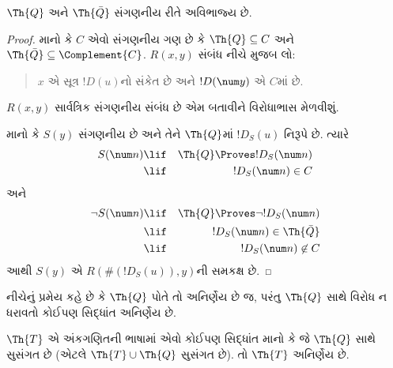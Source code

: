 \begin{lem}
$\Th{Q}$ અને
$\Th{\bar Q}$ સંગણનીય
રીતે અવિભાજ્ય છે.
\end{lem}

\begin{proof}
માનો કે $C$ એવો સંગણનીય
ગણ છે કે $\Th{Q} \subseteq C$
અને $\Th{\bar Q} \subseteq \Complement{C}$.
$R(x,y)$ સંબંધ નીચે મુજબ લો:
\begin{quote}
$x$ એ સૂત્ર $!D(u)$નો
સંકેત છે અને $!D(\num y)$
એ $C$માં છે.
\end{quote}
$R(x,y)$ સાર્વત્રિક
સંગણનીય સંબંધ છે એમ
બતાવીને વિરોધાભાસ
મેળવીશું.

માનો કે $S(y)$ સંગણનીય
છે અને તેને $\Th{Q}$માં
$!D_S(u)$ નિરૂપે છે.
ત્યારે
\begin{eqnarray*}
S(\num n) & \lif & \Th{Q} \Proves !D_S(\num n) \\
& \lif & !D_S(\num n) \in C
\end{eqnarray*}
અને
\begin{eqnarray*}
\lnot S(\num n) & \lif & \Th{Q} \Proves \lnot !D_S(\num n) \\
& \lif & !D_S(\num n) \in \Th{\bar Q} \\
& \lif & !D_S(\num n) \not\in C
\end{eqnarray*}
આથી $S(y)$ એ
$R(\#(!D_S(u)),y)$ની
સમકક્ષ છે.
\end{proof}
\endgroup


\begingroup
\makeatletter{}\makeatother


\label{guunit:OLP-0310}


નીચેનું પ્રમેય કહે છે કે
$\Th{Q}$ પોતે તો અનિર્ણેય
છે જ, પરંતુ $\Th{Q}$ સાથે
વિરોધ ન ધરાવતો કોઈપણ
સિદ્ધાંત અનિર્ણેય છે.

\begin{thm}
$\Th{T}$ એ અંકગણિતની
ભાષામાં એવો કોઈપણ સિદ્ધાંત
માનો કે જે $\Th{Q}$ સાથે
સુસંગત છે (એટલે
$\Th{T} \cup \Th{Q}$
સુસંગત છે). તો
$\Th{T}$ અનિર્ણેય છે.
\end{thm}

